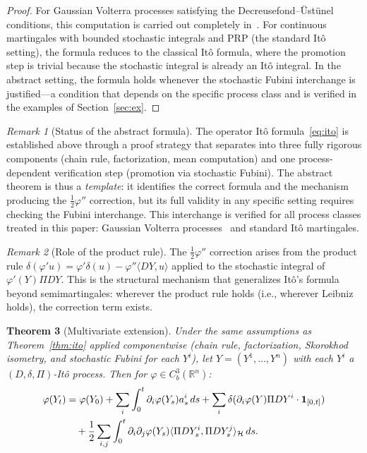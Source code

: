 \documentclass[11pt,a4paper]{article}
\theoremstyle{plain}
\newtheorem{theorem}{Theorem}[section]
\theoremstyle{definition}
\theoremstyle{remark}
\newtheorem{remark}[theorem]{Remark}
\newcommand{\R}{\mathbb{R}}
\begin{document}
\begin{proof}
For Gaussian Volterra processes satisfying the Decreusefond--\"Ust\"unel conditions, this computation is carried out completely in~\cite[Theorem 4.1]{Decreusefond1999}. For continuous martingales with bounded stochastic integrals and PRP (the standard It\^o setting), the formula reduces to the classical It\^o formula, where the promotion step is trivial because the stochastic integral is already an It\^o integral. In the abstract setting, the formula holds whenever the stochastic Fubini interchange is justified---a condition that depends on the specific process class and is verified in the examples of Section~\ref{sec:ex}.
\end{proof}

\begin{remark}[Status of the abstract formula]\label{rem:ito_status}
The operator It\^o formula~\eqref{eq:ito} is established above through a proof strategy that separates into three fully rigorous components (chain rule, factorization, mean computation) and one process-dependent verification step (promotion via stochastic Fubini). The abstract theorem is thus a \emph{template}: it identifies the correct formula and the mechanism producing the $\frac{1}{2}\varphi''$ correction, but its full validity in any specific setting requires checking the Fubini interchange. This interchange is verified for all process classes treated in this paper: Gaussian Volterra processes~\cite{Decreusefond1999} and standard It\^o martingales.
\end{remark}

\begin{remark}[Role of the product rule]\label{rem:prod_role}
The $\frac{1}{2}\varphi''$ correction arises from the product rule $\delta(\varphi'u) = \varphi'\delta(u)-\varphi''\langle DY,u\rangle$ applied to the stochastic integral of $\varphi'(Y)\Pi DY$. This is the structural mechanism that generalizes It\^o's formula beyond semimartingales: wherever the product rule holds (i.e., wherever Leibniz holds), the correction term exists.
\end{remark}

\begin{theorem}[Multivariate extension]\label{thm:multi_ito}
Under the same assumptions as Theorem~\ref{thm:ito} applied componentwise (chain rule, factorization, Skorokhod isometry, and stochastic Fubini for each $Y^i$), let $Y = (Y^1,\ldots,Y^n)$ with each $Y^i$ a $(D,\delta,\Pi)$-It\^o process. Then for $\varphi \in C_b^3(\R^n)$:
\begin{align}
\varphi(Y_t) &= \varphi(Y_0)+\sum_i\int_0^t\partial_i\varphi(Y_s)a^i_s\,ds+\sum_i\delta(\partial_i\varphi(Y)\Pi DY^i\cdot\mathbf{1}_{[0,t]}) \notag\\
&\quad+\frac{1}{2}\sum_{i,j}\int_0^t\partial_i\partial_j\varphi(Y_s)\langle\Pi DY^i_s,\Pi DY^j_s\rangle_{\mathcal{H}}\,ds. \label{eq:multi_ito}
\end{align}
\end{theorem}
\end{document}
